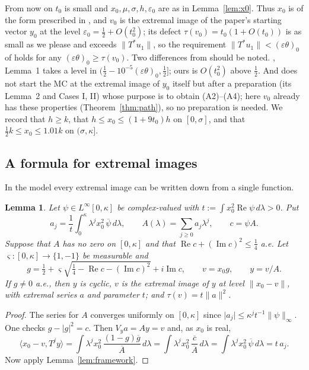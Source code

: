 \documentclass[11pt]{article}
\newtheorem{lemma}[theorem]{Lemma}
\theoremstyle{definition}
\newcommand{\ip}[2]{\langle #1,#2\rangle}
\newcommand{\norm}[1]{\lVert #1\rVert}
\newcommand{\abs}[1]{\lvert #1\rvert}
\newcommand{\re}{\operatorname{Re}}
\begin{document}
From now on $t_0$ is small and $x_0,\mu,\sigma,h,\varepsilon_0$ are as in Lemma~\ref{lem:x0}.
Thus $x_0$ is of the form prescribed in \cite{E}, and $v_0$ is the extremal image of the
paper's starting vector $y_0$ at the level $\varepsilon_0=\frac12+O(t_0^2)$; its defect
$\tau(v_0)=t_0(1+O(t_0))$ is as small as we please and exceeds $\norm{T^*u_1}$, so the
requirement $\norm{T^*u_1}<(\varepsilon\theta)_0$ of \cite{E} holds for any
$(\varepsilon\theta)_0\ge\tau(v_0)$. Two differences from \cite{E} should be noted.
\cite{E}, Lemma~1 takes a level in $(\frac12-10^{-5}(\varepsilon\theta)_0,\frac12]$; ours is
$O(t_0^2)$ above $\frac12$. And \cite{E} does not start the MC at the extremal image of $y_0$
itself but after a preparation (its Lemma~2 and Cases I, II) whose purpose is to obtain
(A2)--(A4); here $v_0$ already has these properties (Theorem~\ref{thm:path}), so no
preparation is needed. We record that $h\ge k$, that $h\le x_0\le(1+9t_0)h$ on $[0,\sigma]$, and that
$\frac12k\le x_0\le1.01k$ on $(\sigma,\kappa]$.

\subsection{A formula for extremal images}
In the model every extremal image can be written down from a single function.

\begin{lemma}\label{lem:explicit}
Let $\psi\in L^\infty[0,\kappa]$ be complex-valued with $t:=\int x_0^2\re\psi\,d\lambda>0$.
Put
\[
a_j=\frac1t\int_0^\kappa\lambda^jx_0^2\,\overline\psi\,d\lambda,\qquad
A(\lambda)=\sum_{j\ge0}a_j\lambda^j,\qquad c=\psi A .
\]
Suppose that $A$ has no zero on $[0,\kappa]$ and that $\re c+(\operatorname{Im}c)^2\le\frac14$
a.e. Let $\varsigma:[0,\kappa]\to\{1,-1\}$ be measurable and
\[
g=\tfrac12+\varsigma\sqrt{\tfrac14-\re c-(\operatorname{Im}c)^2}+i\operatorname{Im}c,
\qquad v=x_0g,\qquad y=v/A .
\]
If $g\ne0$ a.e., then $y$ is cyclic, $v$ is the extremal image of $y$ at level
$\norm{x_0-v}$, with extremal series $a$ and parameter $t$; and $\tau(v)=t\norm a^2$.
\end{lemma}
\begin{proof}
The series for $A$ converges uniformly on $[0,\kappa]$ since
$\abs{a_j}\le\kappa^jt^{-1}\norm{\psi}_\infty$. One checks $g-\abs g^2=c$. Then
$V_ya=Ay=v$ and, as $x_0$ is real,
\[
\ip{x_0-v}{T^jy}=\int\lambda^jx_0^2\,\frac{(1-g)\overline g}{\overline A}\,d\lambda
=\int\lambda^jx_0^2\,\frac{\overline c}{\overline A}\,d\lambda
=\int\lambda^jx_0^2\,\overline\psi\,d\lambda=t\,a_j .
\]
Now apply Lemma~\ref{lem:framework}.
\end{proof}
\end{document}
